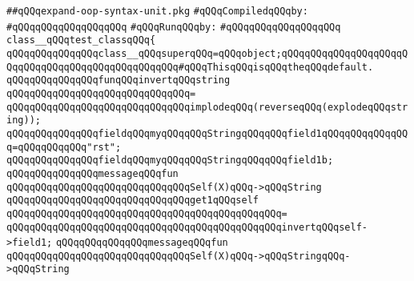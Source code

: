 \label{src/lib/compiler/front/typer/main/expand-oop-syntax-unit-test.pkg}
\verb|##qQQqexpand-oop-syntax-unit.pkg|\newline
\newline
\verb|#qQQqCompiledqQQqby:|\newline
\verb|#qQQqqQQqqQQqqQQqqQQq|\newline
\newline
\verb|#qQQqRunqQQqby:|\newline
\verb|#qQQqqQQqqQQqqQQqqQQq|\newline
\newline
\newline
\newline
\verb|class__qQQqtest_classqQQq{|\newline
\newline
\verb|qQQqqQQqqQQqqQQqclass__qQQqsuperqQQq=qQQqobject;qQQqqQQqqQQqqQQqqQQqqQQqqQQqqQQqqQQqqQQqqQQqqQQqqQQq#qQQqThisqQQqisqQQqtheqQQqdefault.|\newline
\newline
\verb|qQQqqQQqqQQqqQQqfunqQQqinvertqQQqstring|\newline
\verb|qQQqqQQqqQQqqQQqqQQqqQQqqQQqqQQq=|\newline
\verb|qQQqqQQqqQQqqQQqqQQqqQQqqQQqqQQqimplodeqQQq(reverseqQQq(explodeqQQqstring));|\newline
\newline
\verb|qQQqqQQqqQQqqQQqfieldqQQqmyqQQqqQQqStringqQQqqQQqfield1qQQqqQQqqQQqqQQq=qQQqqQQqqQQq"rst";|\newline
\verb|qQQqqQQqqQQqqQQqfieldqQQqmyqQQqqQQqStringqQQqqQQqfield1b;|\newline
\newline
\verb|qQQqqQQqqQQqqQQqmessageqQQqfun|\newline
\verb|qQQqqQQqqQQqqQQqqQQqqQQqqQQqqQQqSelf(X)qQQq->qQQqString|\newline
\verb|qQQqqQQqqQQqqQQqqQQqqQQqqQQqqQQqget1qQQqself|\newline
\verb|qQQqqQQqqQQqqQQqqQQqqQQqqQQqqQQqqQQqqQQqqQQqqQQq=|\newline
\verb|qQQqqQQqqQQqqQQqqQQqqQQqqQQqqQQqqQQqqQQqqQQqqQQqinvertqQQqself->field1;|\newline
\newline
\verb|qQQqqQQqqQQqqQQqmessageqQQqfun|\newline
\verb|qQQqqQQqqQQqqQQqqQQqqQQqqQQqqQQqSelf(X)qQQq->qQQqStringqQQq->qQQqString|\newline
